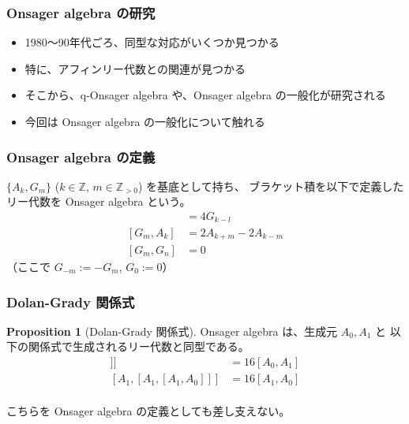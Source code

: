 \documentclass{beamer}
\theoremstyle{definition}
\newtheorem{proposition}{Proposition}
\begin{document}
\begin{frame}
    \frametitle{Onsager algebra の研究}

    \begin{itemize}
        \item 1980〜90年代ごろ、同型な対応がいくつか見つかる
        \item 特に、アフィンリー代数との関連が見つかる
        \item そこから、q-Onsager algebra や、Onsager algebra の一般化が研究される
        \item 今回は Onsager algebra の一般化について触れる
    \end{itemize}
\end{frame}

\begin{frame}
    \frametitle{Onsager algebra の定義}

    \begin{definition}
        \( \{A_k, G_m\} \) (\( k \in \mathbb{Z} \), \( m \in \mathbb{Z}_{>0} \)) を基底として持ち、
        ブラケット積を以下で定義したリー代数を Onsager algebra という。
        \begin{align*}
            [A_k, A_l] & = 4G_{k-l}            \\
            [G_m, A_k] & = 2A_{k+m} - 2A_{k-m} \\
            [G_m, G_n] & = 0
        \end{align*}
        （ここで \(G_{-m} := -G_m\), \(G_0 := 0\)）
    \end{definition}
\end{frame}

\begin{frame}
    \frametitle{Dolan-Grady 関係式}

    \begin{proposition}[Dolan-Grady 関係式]
        Onsager algebra は、生成元 \(A_0, A_1\) と
        以下の関係式で生成されるリー代数と同型である。
        \begin{align*}
            [A_0, [A_0, [A_0, A_1]]] & = 16[A_0, A_1] \\
            [A_1, [A_1, [A_1, A_0]]] & = 16[A_1, A_0] \\
        \end{align*}
    \end{proposition}

    こちらを Onsager algebra の定義としても差し支えない。
\end{frame}
\end{document}

